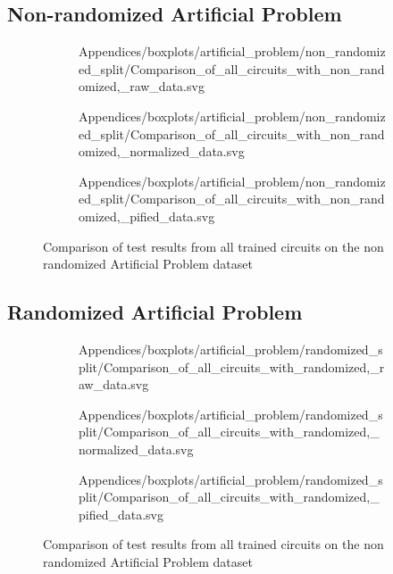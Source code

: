 \clearpage 
\subsection{Non-randomized Artificial Problem}
\label{chapter:artificial_problem_non_randomized}

\begin{figure}[!h]
    \begin{subfigure}{.5\textwidth}
        \centering
        
        {Appendices/boxplots/artificial_problem/non_randomized_split/Comparison_of_all_circuits_with_non_randomized,_raw_data.svg}
    \end{subfigure}
    \begin{subfigure}{.5\textwidth}
        \centering
        
        {Appendices/boxplots/artificial_problem/non_randomized_split/Comparison_of_all_circuits_with_non_randomized,_normalized_data.svg}
    \end{subfigure}
    \begin{subfigure}{.5\textwidth}
        \centering
        
        {Appendices/boxplots/artificial_problem/non_randomized_split/Comparison_of_all_circuits_with_non_randomized,_pified_data.svg}
    \end{subfigure}
    \caption{Comparison of test results from all trained circuits on the non randomized Artificial Problem dataset}
    \label{fig:circuits_results_non_r_ap}
\end{figure}

\clearpage 
\subsection{Randomized Artificial Problem}
\label{chapter:artificial_problem_randomized}
\begin{figure}[!h]
    \begin{subfigure}{.5\textwidth}
        \centering
        
        {Appendices/boxplots/artificial_problem/randomized_split/Comparison_of_all_circuits_with_randomized,_raw_data.svg}
    \end{subfigure}
    \begin{subfigure}{.5\textwidth}
        \centering
        
        {Appendices/boxplots/artificial_problem/randomized_split/Comparison_of_all_circuits_with_randomized,_normalized_data.svg}
    \end{subfigure}
    \begin{subfigure}{.5\textwidth}
        \centering
        
        {Appendices/boxplots/artificial_problem/randomized_split/Comparison_of_all_circuits_with_randomized,_pified_data.svg}
    \end{subfigure}
    \caption{Comparison of test results from all trained circuits on the non randomized Artificial Problem dataset}
    \label{fig:circuits_results_r_ap}
\end{figure}

